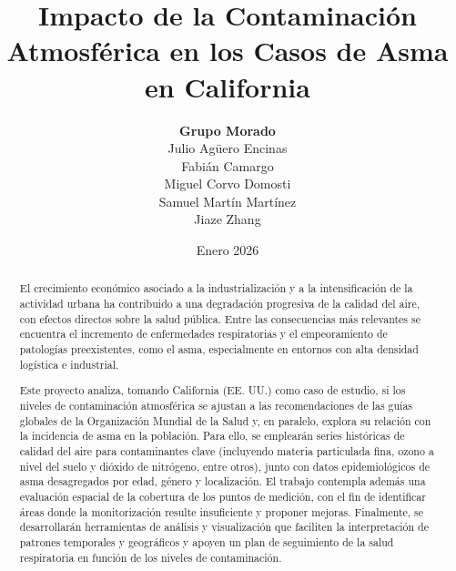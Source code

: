 \documentclass[12pt, letterpaper]{report}
\title{\textbf{Impacto de la Contaminación Atmosférica en los Casos de Asma en California}}
\author{\textbf{Grupo Morado}\\
    Julio Agüero Encinas\\
    Fabián Camargo\\
    Miguel Corvo Domosti\\
    Samuel Martín Martínez\\
    Jiaze Zhang}
\date{Enero 2026}
\newif\ifdraft
\begin{document}
	
	\maketitle
    
    \begin{abstract}
    El crecimiento económico asociado a la industrialización y a la intensificación de la actividad urbana ha
    contribuido a una degradación progresiva de la calidad del aire, con efectos directos sobre la salud pública.
    Entre las consecuencias más relevantes se encuentra el incremento de enfermedades respiratorias y el empeoramiento
    de patologías preexistentes, como el asma, especialmente en entornos con alta densidad logística e industrial.
    
    Este proyecto analiza, tomando California (EE. UU.) como caso de estudio, si los niveles de contaminación
    atmosférica se ajustan a las recomendaciones de las guías globales de la Organización Mundial de la Salud y, en
    paralelo, explora su relación con la incidencia de asma en la población.
    Para ello, se emplearán series históricas de calidad del aire para contaminantes clave (incluyendo materia
    particulada fina, ozono a nivel del suelo y dióxido de nitrógeno, entre otros), junto con datos epidemiológicos de
    asma desagregados por edad, género y localización.
    El trabajo contempla además una evaluación espacial de la cobertura de los puntos de medición, con el fin de
    identificar áreas donde la monitorización resulte insuficiente y proponer mejoras.
    Finalmente, se desarrollarán herramientas de análisis y visualización que faciliten la interpretación de patrones
    temporales y geográficos y apoyen un plan de seguimiento de la salud respiratoria en función de los niveles de contaminación.
    \end{abstract}

	
	\tableofcontents
 
    \ifdraft
        
        
        
        
        

    \else
        
        
        

        
        
        


        
        
        
    \fi
    
	\appendix
	
	
    
    
\end{document}
